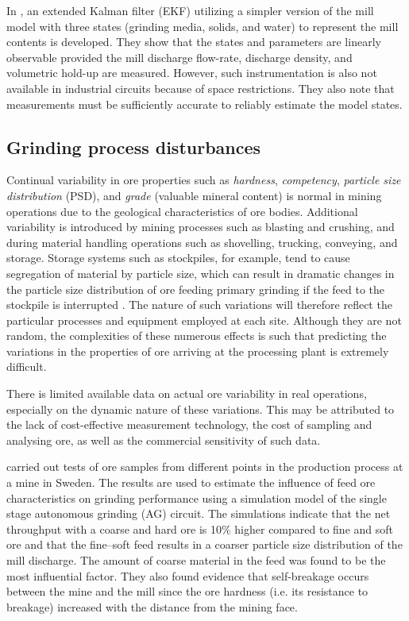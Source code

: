 In \cite{le_roux_ekf_2017}, an extended Kalman filter (EKF) utilizing a simpler version of the mill model with three states (grinding media, solids, and water) to represent the mill contents is developed. They show that the states and parameters are linearly observable provided the mill discharge flow-rate, discharge density, and volumetric hold-up are measured. However, such instrumentation is also not available in industrial circuits because of space restrictions. They also note that measurements must be sufficiently accurate to reliably estimate the model states.

\subsection{Grinding process disturbances}

Continual variability in ore properties such as \textit{hardness}, \textit{competency}, \textit{particle size distribution} (PSD), and \textit{grade} (valuable mineral content) is normal in mining operations due to the geological characteristics of ore bodies. Additional variability is introduced by mining processes such as blasting and crushing, and during material handling operations such as shovelling, trucking, conveying, and storage. Storage systems such as stockpiles, for example, tend to cause segregation of material by particle size, which can result in dramatic changes in the particle size distribution of ore feeding primary grinding if the feed to the stockpile is interrupted \citep{estrada_hybrid_2014}. The nature of such variations will therefore reflect the particular processes and equipment employed at each site. Although they are not random, the complexities of these numerous effects is such that predicting the variations in the properties of ore arriving at the processing plant is extremely difficult.

There is limited available data on actual ore variability in real operations, especially on the dynamic nature of these variations. This may be attributed to the lack of cost-effective measurement technology, the cost of sampling and analysing ore, as well as the commercial sensitivity of such data.

\cite{hahne_ore_2003} carried out tests of ore samples from different points in the production process at a mine in Sweden. The results are used to estimate the influence of feed ore characteristics on grinding performance using a simulation model of the single stage autonomous grinding (AG) circuit. The simulations indicate that the net throughput with a coarse and hard ore is 10\% higher compared to fine and soft ore and that the fine–soft feed results in a coarser particle size distribution of the mill discharge. The amount of coarse material in the feed was found to be the most influential factor. They also found evidence that self-breakage occurs between the mine and the mill since the ore hardness (i.e. its resistance to breakage) increased with the distance from the mining face.

